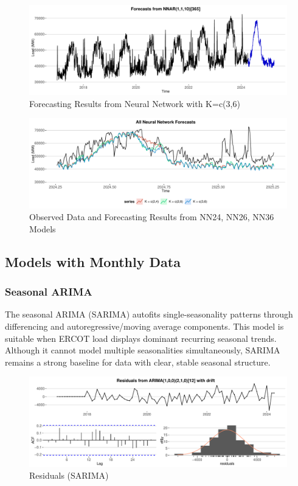 \documentclass[
]{article}
\begin{document}
\begin{figure}
\centering
\includegraphics{FinalProject_Report_files/figure-latex/unnamed-chunk-15-1.pdf}
\caption{Forecasting Results from Neural Network with K=c(3,6)}
\end{figure}

\begin{figure}
\centering
\includegraphics{FinalProject_Report_files/figure-latex/unnamed-chunk-16-1.pdf}
\caption{Observed Data and Forecasting Results from NN24, NN26, NN36
Models}
\end{figure}

\newpage

\subsection{Models with Monthly Data}\label{models-with-monthly-data}

\subsubsection{Seasonal ARIMA}\label{seasonal-arima}

The seasonal ARIMA (SARIMA) autofits single-seasonality patterns through
differencing and autoregressive/moving average components. This model is
suitable when ERCOT load displays dominant recurring seasonal trends.
Although it cannot model multiple seasonalities simultaneously, SARIMA
remains a strong baseline for data with clear, stable seasonal
structure.

\begin{figure}
\centering
\includegraphics{FinalProject_Report_files/figure-latex/unnamed-chunk-17-1.pdf}
\caption{Residuals (SARIMA)}
\end{figure}
\end{document}
